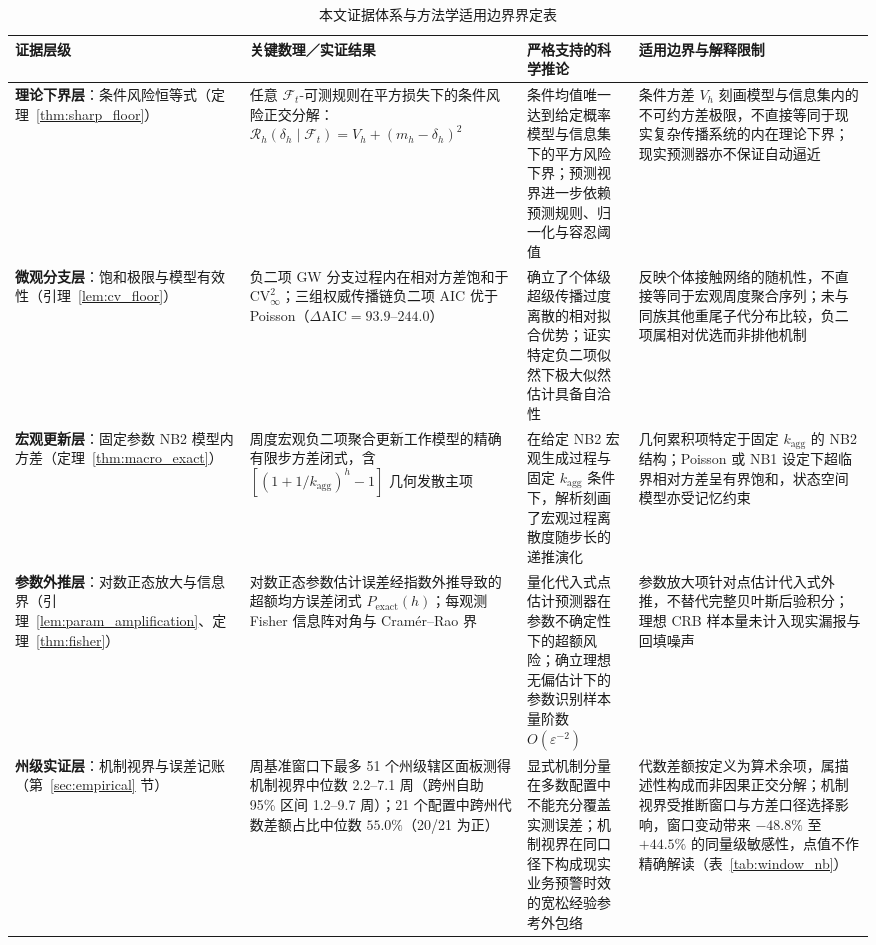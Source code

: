 \documentclass[10pt,UTF8,a4paper,zihao=-4]{ctexart}
\theoremstyle{plain}
\theoremstyle{remark}
\begin{document}
\begin{table}[htbp]
\centering
\footnotesize
\setlength{\tabcolsep}{3.5pt}
\renewcommand{\arraystretch}{1.08}
\caption{本文证据体系与方法学适用边界界定表}
\label{tab:claim_hierarchy}
\begin{tabular}{@{}>{\raggedright\arraybackslash}p{2.45cm}>{\raggedright\arraybackslash}p{4.3cm}>{\raggedright\arraybackslash}p{4.1cm}>{\raggedright\arraybackslash}p{4.45cm}@{}}
\toprule
证据层级 & 关键数理／实证结果 & 严格支持的科学推论 & 适用边界与解释限制 \\
\midrule
\textbf{理论下界层}：条件风险恒等式（定理~\ref{thm:sharp_floor}） & 任意 $\mathcal{F}_t$-可测规则在平方损失下的条件风险正交分解：$\mathcal{R}_h(\delta_h\mid\mathcal{F}_t) = V_h + (m_h - \delta_h)^2$ & 条件均值唯一达到给定概率模型与信息集下的平方风险下界；预测视界进一步依赖预测规则、归一化与容忍阈值 & 条件方差 $V_h$ 刻画模型与信息集内的不可约方差极限，不直接等同于现实复杂传播系统的内在理论下界；现实预测器亦不保证自动逼近 \\
\addlinespace[2pt]
\textbf{微观分支层}：饱和极限与模型有效性（引理~\ref{lem:cv_floor}） & 负二项 GW 分支过程内在相对方差饱和于 $\text{CV}^2_\infty$；三组权威传播链负二项 AIC 优于 Poisson（$\Delta\text{AIC} = 93.9\text{--}244.0$） & 确立了个体级超级传播过度离散的相对拟合优势；证实特定负二项似然下极大似然估计具备自洽性 & 反映个体接触网络的随机性，不直接等同于宏观周度聚合序列；未与同族其他重尾子代分布比较，负二项属相对优选而非排他机制 \\
\addlinespace[2pt]
\textbf{宏观更新层}：固定参数 NB2 模型内方差（定理~\ref{thm:macro_exact}） & 周度宏观负二项聚合更新工作模型的精确有限步方差闭式，含 $[(1+1/k_{\text{agg}})^h - 1]$ 几何发散主项 & 在给定 NB2 宏观生成过程与固定 $k_{\text{agg}}$ 条件下，解析刻画了宏观过程离散度随步长的递推演化 & 几何累积项特定于固定 $k_{\text{agg}}$ 的 NB2 结构；Poisson 或 NB1 设定下超临界相对方差呈有界饱和，状态空间模型亦受记忆约束 \\
\addlinespace[2pt]
\textbf{参数外推层}：对数正态放大与信息界（引理~\ref{lem:param_amplification}、定理~\ref{thm:fisher}） & 对数正态参数估计误差经指数外推导致的超额均方误差闭式 $P_{\text{exact}}(h)$；每观测 Fisher 信息阵对角与 Cram\'er--Rao 界 & 量化代入式点估计预测器在参数不确定性下的超额风险；确立理想无偏估计下的参数识别样本量阶数 $O(\varepsilon^{-2})$ & 参数放大项针对点估计代入式外推，不替代完整贝叶斯后验积分；理想 CRB 样本量未计入现实漏报与回填噪声 \\
\addlinespace[2pt]
\textbf{州级实证层}：机制视界与误差记账（第~\ref{sec:empirical} 节） & 5 周基准窗口下最多 51 个州级辖区面板测得机制视界中位数 2.2--7.1 周（跨州自助 95\% 区间 1.2--9.7 周）；21 个配置中跨州代数差额占比中位数 $55.0\%$（20/21 为正） & 显式机制分量在多数配置中不能充分覆盖实测误差；机制视界在同口径下构成现实业务预警时效的宽松经验参考外包络 & 代数差额按定义为算术余项，属描述性构成而非因果正交分解；机制视界受推断窗口与方差口径选择影响，窗口变动带来 $-48.8\%$ 至 $+44.5\%$ 的同量级敏感性，点值不作精确解读（表~\ref{tab:window_nb}） \\

\end{tabular}
\end{table}
\end{document}
